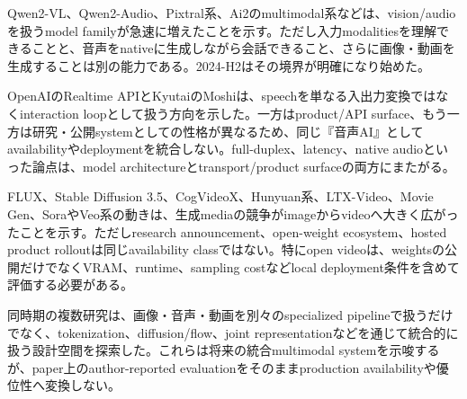 Qwen2-VL、Qwen2-Audio、Pixtral系、Ai2のmultimodal系などは、vision/audioを扱うmodel familyが急速に増えたことを示す。ただし入力modalitiesを理解できることと、音声をnativeに生成しながら会話できること、さらに画像・動画を生成することは別の能力である。2024-H2はその境界が明確になり始めた。\autocite{src-56b3abdc51a9,src-72d4a57e9c16,src-9f35f00f9f9c,src-d483c7d9838b,src-feb76866f5df}


OpenAIのRealtime APIとKyutaiのMoshiは、speechを単なる入出力変換ではなくinteraction loopとして扱う方向を示した。一方はproduct/API surface、もう一方は研究・公開systemとしての性格が異なるため、同じ『音声AI』としてavailabilityやdeploymentを統合しない。full-duplex、latency、native audioといった論点は、model architectureとtransport/product surfaceの両方にまたがる。\autocite{src-4a870e1e2c95,src-c5ed64e39d0c}


FLUX、Stable Diffusion 3.5、CogVideoX、Hunyuan系、LTX-Video、Movie Gen、SoraやVeo系の動きは、生成mediaの競争がimageからvideoへ大きく広がったことを示す。ただしresearch announcement、open-weight ecosystem、hosted product rolloutは同じavailability classではない。特にopen videoは、weightsの公開だけでなくVRAM、runtime、sampling costなどlocal deployment条件を含めて評価する必要がある。\autocite{src-06d2114e2823,src-2d134659d4de,src-d1b80acf98c2,src-d33cd3d41599,src-d50c19922f51,src-e91cbf23fde6,src-f6c8da8253fb}


同時期の複数研究は、画像・音声・動画を別々のspecialized pipelineで扱うだけでなく、tokenization、diffusion/flow、joint representationなどを通じて統合的に扱う設計空間を探索した。これらは将来の統合multimodal systemを示唆するが、paper上のauthor-reported evaluationをそのままproduction availabilityや優位性へ変換しない。\autocite{src-25c4073c2a29,src-5ff9bff435a6,src-680a61ed20c0,src-770e33132b09,src-e38a55668df9,src-e7d2578ccb4d,src-f6b059ed7fb2,src-fa0d8178b72a}


